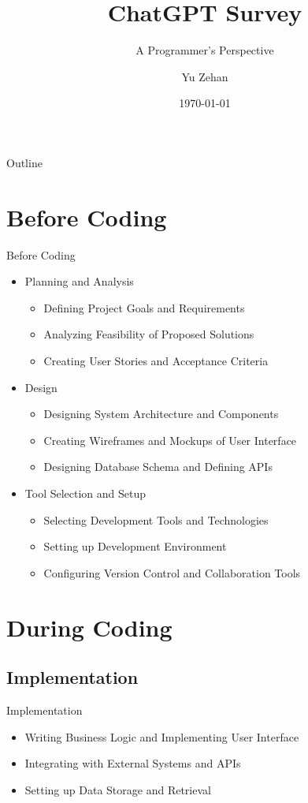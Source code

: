\documentclass{beamer}
\title{ChatGPT Survey}
\subtitle{A Programmer's Perspective}
\author{Yu Zehan}
\institute{Intel FLEX}
\date{\today}
\begin{document}
\begin{frame}
  \titlepage
\end{frame}

\begin{frame}{Outline}
  \tableofcontents
\end{frame}

\section{Before Coding}
\begin{frame}{Before Coding}
    \begin{itemize}
        \item Planning and Analysis
        \begin{itemize}
            \item Defining Project Goals and Requirements
            \item Analyzing Feasibility of Proposed Solutions
            \item Creating User Stories and Acceptance Criteria
        \end{itemize}
        \item Design
        \begin{itemize}
            \item Designing System Architecture and Components
            \item Creating Wireframes and Mockups of User Interface
            \item Designing Database Schema and Defining APIs
        \end{itemize}
        \item Tool Selection and Setup
        \begin{itemize}
            \item Selecting Development Tools and Technologies
            \item Setting up Development Environment
            \item Configuring Version Control and Collaboration Tools
        \end{itemize}
    \end{itemize}
\end{frame}

\section{During Coding}
\subsection{Implementation}
\begin{frame}{Implementation}
    \begin{itemize}
        \item Writing Business Logic and Implementing User Interface
        \item Integrating with External Systems and APIs
        \item Setting up Data Storage and Retrieval
    \end{itemize}
\end{frame}
\end{document}
